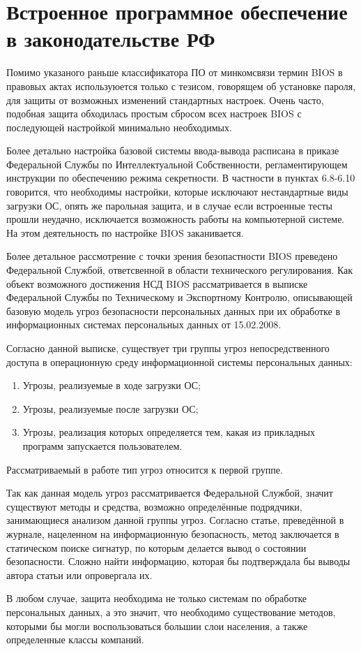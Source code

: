 \section{Встроенное программное обеспечение в законодательстве РФ}
Помимо указаного раньше классификатора ПО от минкомсвязи\cite{minkomsvyaz:klassificator} 
термин BIOS в правовых актах используюется только с тезисом,
	говорящем об установке пароля,
	для защиты от возможных изменений стандартных настроек.
Очень часто, подобная защита обходилась простым сбросом всех настроек BIOS с последующей настройкой минимально необходимых.

Более детально настройка базовой системы ввода-вывода расписана в приказе Федеральной Службы по Интеллектуальной Собственности\cite{FSIS:prikaz},
	регламентирующем инструкции по обеспечению режима секретности.
В частности в пунктах 6.8-6.10  говорится,
	что необходимы настройки,
		которые исключают нестандартные виды загрузки ОС,
опять же парольная защита,
и в случае если встроенные тесты прошли неудачно, исключается возможность работы на компьютерной системе.
На этом деятельность по настройке BIOS заканивается.

Более детальное рассмотрение с точки зрения безопастности BIOS преведено Федеральной Службой, ответсвенной в области технического регулирования.
Как объект возможного достижения НСД BIOS рассматривается в выписке Федеральной Службы по Техническому и Экспортному Контролю\cite{FSTEK:vipiska},
	описывающей базовую модель угроз безопасности персональных данных при их обработке в информационных системах персональных данных от 15.02.2008.

Согласно данной выписке, существует три группы угроз непосредственного доступа в операционную среду информационной системы персональных данных:
\begin{enumerate}
\item Угрозы, реализуемые в ходе загрузки ОС;
\item Угрозы, реализуемые после загрузки ОС;
\item Угрозы, реализация которых определяется тем, какая из прикладных программ запускается пользователем.
\end{enumerate}

Рассматриваемый в работе тип угроз относится к первой группе.

Так как данная модель угроз рассматривается Федеральной Службой,
	значит существуют методы и средства,
	возможно определённые подрядчики,
		занимающиеся анализом данной группы угроз.
Согласно статье\cite{Xakep:ChinaSpy}, преведённой в журнале, нацеленном на информационную безопасность, метод заключается в статическом поиске сигнатур,
	по которым делается вывод о состоянии безопасности.
Сложно найти информацию, которая бы подтверждала бы выводы автора статьи или опровергала их.

В любом случае, защита необходима не только системам по обработке персональных данных, а это значит, что необходимо существование методов, которыми бы могли воспользоваться большии слои населения, а также определенные классы компаний.
